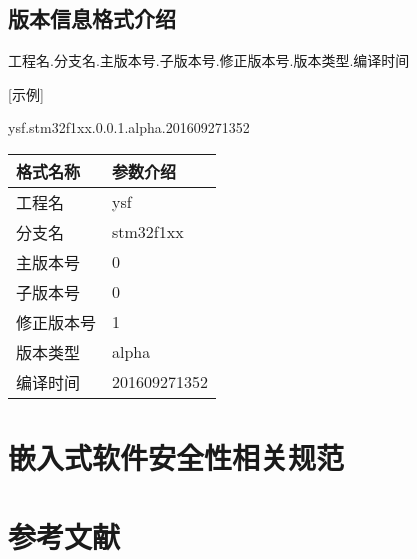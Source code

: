 \documentclass[UTF8,a4paper,12pt]{article}
\begin{document}
	\subsection{版本信息格式介绍}
	\begin{center}
	工程名.分支名.主版本号.子版本号.修正版本号.版本类型.编译时间\\
	\end{center}
 
	[示例]
	\begin{center}
	ysf.stm32f1xx.0.0.1.alpha.201609271352
	\end{center}

	\begin{center}
		\begin{tabular}{|p{5cm}|p{5cm}|}  
			\hline
			格式名称 & 参数介绍 \\ \hline
			工程名 & ysf \\ \hline
			分支名 & stm32f1xx \\ \hline
			主版本号 & 0 \\ \hline
			子版本号 & 0 \\ \hline
			修正版本号 & 1 \\ \hline
			版本类型 & alpha \\ \hline
			编译时间 & 201609271352 \\ \hline
		\end{tabular}
	\end{center}
	\newpage
	
	\section{嵌入式软件安全性相关规范}
	\newpage
	
	\section{参考文献}
	\newpage
\end{document}
